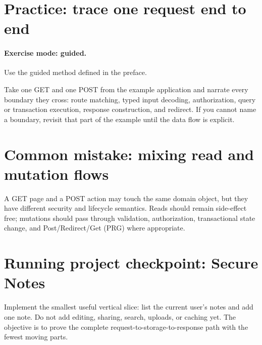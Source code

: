 \section{Practice: trace one request end to end}
\paragraph{Exercise mode: guided.} Use the guided method defined in the preface.

Take one GET and one POST from the example application and narrate every boundary they cross: route matching, typed input decoding, authorization, query or transaction execution, response construction, and redirect. If you cannot name a boundary, revisit that part of the example until the data flow is explicit.

\section{Common mistake: mixing read and mutation flows}
A GET page and a POST action may touch the same domain object, but they have different security and lifecycle semantics. Reads should remain side-effect free; mutations should pass through validation, authorization, transactional state change, and Post/Redirect/Get (PRG) where appropriate.

\section{Running project checkpoint: Secure Notes}
Implement the smallest useful vertical slice: list the current user's notes and add one note. Do not add editing, sharing, search, uploads, or caching yet. The objective is to prove the complete request-to-storage-to-response path with the fewest moving parts.
